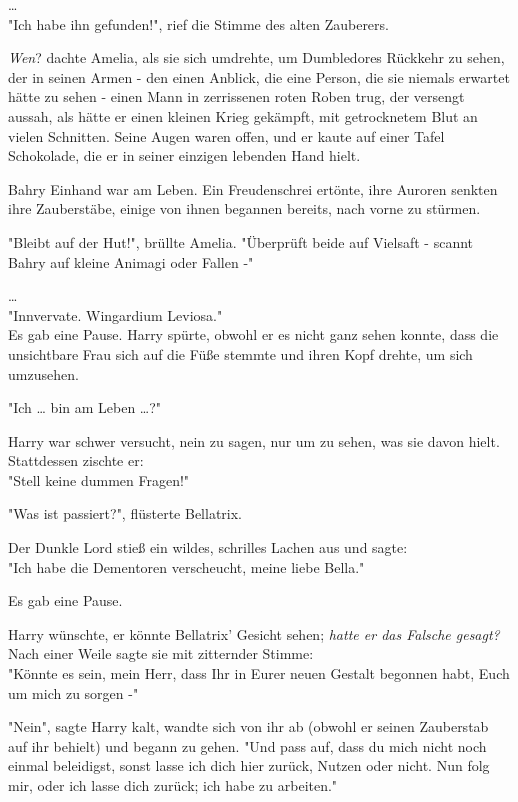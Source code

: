 {…\\ "Ich habe ihn gefunden!", rief die Stimme des alten Zauberers.

\emph{Wen}? dachte Amelia, als sie sich umdrehte, um Dumbledores Rückkehr zu sehen, der in seinen Armen - den einen Anblick, die eine Person, die sie niemals erwartet hätte zu sehen - einen Mann in zerrissenen roten Roben trug, der versengt aussah, als hätte er einen kleinen Krieg gekämpft, mit getrocknetem Blut an vielen Schnitten. Seine Augen waren offen, und er kaute auf einer Tafel Schokolade, die er in seiner einzigen lebenden Hand hielt.

Bahry Einhand war am Leben. Ein Freudenschrei ertönte, ihre Auroren senkten ihre Zauberstäbe, einige von ihnen begannen bereits, nach vorne zu stürmen.

"Bleibt auf der Hut!", brüllte Amelia. "Überprüft beide auf Vielsaft - scannt Bahry auf kleine Animagi oder Fallen -"

…\\ "Innvervate. Wingardium Leviosa."\\ Es gab eine Pause. Harry spürte, obwohl er es nicht ganz sehen konnte, dass die unsichtbare Frau sich auf die Füße stemmte und ihren Kopf drehte, um sich umzusehen.

"Ich … bin am Leben …?"

Harry war schwer versucht, nein zu sagen, nur um zu sehen, was sie davon hielt.\\ Stattdessen zischte er:\\ "Stell keine dummen Fragen!"

"Was ist passiert?", flüsterte Bellatrix.

Der Dunkle Lord stieß ein wildes, schrilles Lachen aus und sagte:\\ "Ich habe die Dementoren verscheucht, meine liebe Bella."

Es gab eine Pause.

Harry wünschte, er könnte Bellatrix' Gesicht sehen; \emph{hatte er das Falsche gesagt?} Nach einer Weile sagte sie mit zitternder Stimme:\\ "Könnte es sein, mein Herr, dass Ihr in Eurer neuen Gestalt begonnen habt, Euch um mich zu sorgen -"

"Nein", sagte Harry kalt, wandte sich von ihr ab (obwohl er seinen Zauberstab auf ihr behielt) und begann zu gehen. "Und pass auf, dass du mich nicht noch einmal beleidigst, sonst lasse ich dich hier zurück, Nutzen oder nicht. Nun folg mir, oder ich lasse dich zurück; ich habe zu arbeiten."

}
